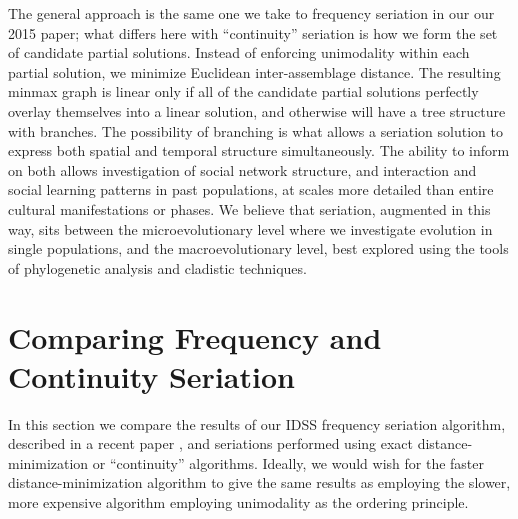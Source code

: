 The general approach is the same one we take to frequency seriation in our our 2015 paper;
what differs here with ``continuity'' seriation is how we form the set
of candidate partial solutions. Instead of enforcing unimodality within
each partial solution, we minimize Euclidean inter-assemblage distance.
The resulting minmax graph is linear only if all of the candidate
partial solutions perfectly overlay themselves into a linear solution,
and otherwise will have a tree structure with branches. The possibility
of branching is what allows a seriation solution to express both spatial
and temporal structure simultaneously. The ability to inform on both
allows investigation of social network structure, and interaction and
social learning patterns in past populations, at scales more detailed
than entire cultural manifestations or phases. We believe that
seriation, augmented in this way, sits between the microevolutionary
level where we investigate evolution in single populations, and the
macroevolutionary level, best explored using the tools of phylogenetic
analysis and cladistic techniques.

\section{Comparing Frequency and Continuity
Seriation}\label{comparing-frequency-and-continuity-seriation}

In this section we compare the results of our IDSS frequency seriation
algorithm, described in a recent paper \citep{lipomadsendunnell2015},
and seriations performed using exact distance-minimization or ``continuity'' algorithms.
Ideally, we would wish for the faster distance-minimization algorithm to give the 
same results as employing the slower, more expensive algorithm employing unimodality
as the ordering principle.

